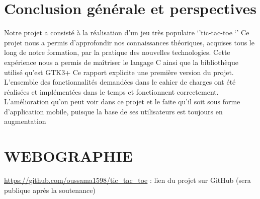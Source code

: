 \chapter{ Conclusion générale et perspectives  } \label{ch:structure}
Notre projet a consisté à la réalisation d’un jeu très populaire ‘’tic-tac-toe ‘’ 
Ce projet nous a permis d’approfondir nos connaissances théoriques, acquises tous le long de notre formation, par la pratique des nouvelles technologies. Cette expérience nous a permis de maîtriser le langage C ainsi que la bibliothèque utilisé qu’est GTK3+
Ce rapport explicite une première version du projet. L’ensemble des fonctionnalités demandées dans le cahier de charges ont été réalisées et implémentées dans le temps et fonctionnent correctement.
L’amélioration qu’on peut voir dans ce projet et le faite qu’il soit sous forme d’application mobile, puisque la base de ses utilisateurs est toujours en augmentation 

\chapter{ WEBOGRAPHIE} \label{ch:structure}
\url{https://github.com/oussama1598/tic_tac_toe} : lien du projet sur GitHub (sera publique après la soutenance)















